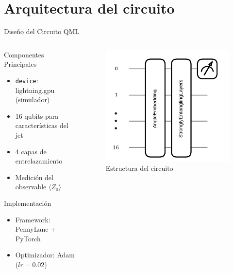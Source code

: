 \documentclass[aspectratio=169]{beamer}
\begin{document}
\section{Arquitectura del circuito}
\begin{frame}{Diseño del Circuito QML}
  \begin{columns}
    \begin{column}{0.55\textwidth}
      \begin{block}{Componentes Principales}
        \begin{itemize}
          \item \texttt{device}: \alert{lightning.gpu} (simulador)
          \item 16 qubits para características del jet
          \item 4 capas de entrelazamiento
          \item Medición del observable $\langle Z_0\rangle$
        \end{itemize}
      \end{block}
      \begin{alertblock}{Implementación}
        \begin{itemize}
          \item Framework: PennyLane + PyTorch
          \item Optimizador: Adam ($lr=0.02$)
        \end{itemize}
      \end{alertblock}
    \end{column}
    \begin{column}{0.45\textwidth}
      \begin{figure}
        \includegraphics[width=\textwidth]{circuito.png}
        \caption{Estructura del circuito}
      \end{figure}
    \end{column}
  \end{columns}
\end{frame}
\end{document}
